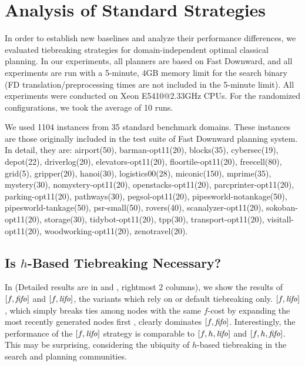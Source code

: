 \section{Analysis of Standard Strategies}
\label{sec:eval-common-strategies}

In order to establish new baselines and analyze their performance differences,
we evaluated tiebreaking strategies for domain-independent optimal
classical planning.  In our experiments, all planners are based on Fast
Downward, and all experiments are run with a 5-minute,
4GB memory limit for the search binary (FD translation/preprocessing
times are not included in the 5-minute limit).  All experiments were
conducted on Xeon E5410@2.33GHz CPUs. For the randomized configurations, we took the average of 10 runs.

We used 1104 instances from 35 standard benchmark domains. These
instances are those originally included in the test suite of Fast
Downward planning system. In detail, they are: airport(50),
barman-opt11(20), blocks(35), cybersec(19), depot(22), driverlog(20),
elevators-opt11(20), floortile-opt11(20), freecell(80), grid(5),
gripper(20), hanoi(30), logistics00(28), miconic(150), mprime(35),
mystery(30), nomystery-opt11(20), openstacks-opt11(20),
parcprinter-opt11(20), parking-opt11(20), pathways(30),
pegsol-opt11(20), pipesworld-notankage(50), pipesworld-tankage(50),
psr-small(50), rovers(40), scanalyzer-opt11(20), sokoban-opt11(20),
storage(30), tidybot-opt11(20), tpp(30), transport-opt11(20),
visitall-opt11(20), woodworking-opt11(20), zenotravel(20).

\subsection{Is $h$-Based Tiebreaking Necessary?}

\label{sec:noh}
In  (Detailed results are in
 and , rightmost 2
columns), we show the results of $[f, {\text{\textit{fifo}}}]$ and $[f, {\text{\textit{lifo}}}]$, the
\astar variants which rely on \fifo or \lifo default tiebreaking only.
$[f,{\text{\textit{lifo}}}]$, which simply breaks ties among nodes with the same
$f$-cost by expanding the most recently generated nodes first
\cite{korf1985depth}, clearly dominates $[f,{\text{\textit{fifo}}}]$.  Interestingly,
the performance of the $[f,{\text{\textit{lifo}}}]$ strategy is comparable to
$[f,h,{\text{\textit{lifo}}}]$ and $[f,h,{\text{\textit{fifo}}}]$.  This may be surprising, considering
the ubiquity of $h$-based tiebreaking in the search and planning
communities.

